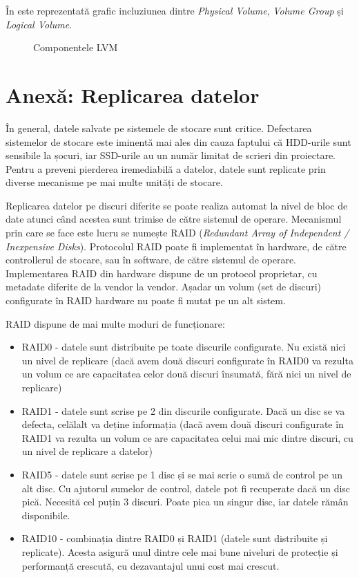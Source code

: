 În  este reprezentată grafic incluziunea
dintre \textit{Physical Volume}, \textit{Volume Group} și \textit{Logical Volume}.

\begin{figure}[htbp]
	\centering
	\def\svgwidth{\columnwidth}
        
	\caption{Componentele LVM}
        \label{fig:storage:lvm}
\end{figure}

\section{Anexă: Replicarea datelor}
\label{sec:storage:raid}

În general, datele salvate pe sistemele de stocare sunt critice. Defectarea
sistemelor de stocare este iminentă mai ales din cauza faptului că HDD-urile
sunt sensibile la șocuri, iar SSD-urile au un număr limitat de scrieri din
proiectare. Pentru a preveni pierderea iremediabilă a datelor, datele sunt
replicate prin diverse mecanisme pe mai multe unități de stocare.

Replicarea datelor pe discuri diferite se poate realiza automat la nivel de bloc
de date atunci când acestea sunt trimise de către sistemul de operare.
Mecanismul prin care se face este lucru se numește RAID  (\textit{Redundant Array of
Independent / Inexpensive Disks}). Protocolul RAID poate fi implementat în hardware,
de către controllerul de stocare, sau în software, de către sistemul de operare.
Implementarea RAID din hardware dispune de un protocol proprietar, cu metadate diferite de
la vendor la vendor. Așadar un volum (set de discuri) configurate în RAID hardware nu
poate fi mutat pe un alt sistem.

RAID dispune de mai multe moduri de funcționare:

\begin{itemize}
	\item RAID0 - datele sunt distribuite pe toate discurile configurate. Nu
		există nici un nivel de replicare (dacă avem două discuri
		configurate în RAID0 va rezulta un volum ce are capacitatea
		celor două discuri însumată, fără nici un nivel de replicare)
	\item RAID1 - datele sunt scrise pe 2 din discurile configurate. Dacă un
		disc se va defecta, celălalt va deține informația (dacă avem
		două discuri configurate în RAID1 va rezulta un volum ce are
		capacitatea celui mai mic dintre discuri, cu un nivel de
		replicare a datelor)
	\item RAID5 - datele sunt scrise pe 1 disc și se mai scrie o sumă de
		control pe un alt disc. Cu ajutorul sumelor de control, datele
		pot fi recuperate dacă un disc pică. Necesită cel puțin 3
		discuri. Poate pica un singur disc, iar datele rămân
		disponibile.
	\item RAID10 - combinația dintre RAID0 și RAID1 (datele sunt distribuite
		și replicate). Acesta asigură unul dintre cele mai bune niveluri
		de protecție și performanță crescută, cu dezavantajul unui cost mai crescut.
\end{itemize}


